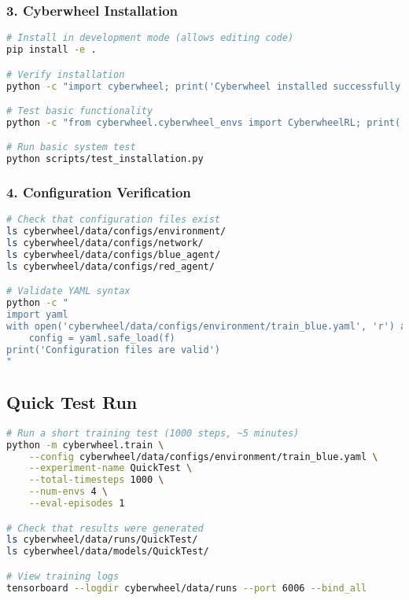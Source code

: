 \documentclass[12pt,a4paper]{article}
\begin{document}
\subsubsection{3. Cyberwheel Installation}
\begin{lstlisting}[language=bash, caption=Install Cyberwheel]
# Install in development mode (allows editing code)
pip install -e .

# Verify installation
python -c "import cyberwheel; print('Cyberwheel installed successfully')"

# Test basic functionality
python -c "from cyberwheel.cyberwheel_envs import CyberwheelRL; print('Environment imported successfully')"

# Run basic system test
python scripts/test_installation.py
\end{lstlisting}

\subsubsection{4. Configuration Verification}
\begin{lstlisting}[language=bash, caption=Verify Configuration Files]
# Check that configuration files exist
ls cyberwheel/data/configs/environment/
ls cyberwheel/data/configs/network/
ls cyberwheel/data/configs/blue_agent/
ls cyberwheel/data/configs/red_agent/

# Validate YAML syntax
python -c "
import yaml
with open('cyberwheel/data/configs/environment/train_blue.yaml', 'r') as f:
    config = yaml.safe_load(f)
print('Configuration files are valid')
"
\end{lstlisting}

\subsection{Quick Test Run}

\begin{lstlisting}[language=bash, caption=Quick Test Execution]
# Run a short training test (1000 steps, ~5 minutes)
python -m cyberwheel.train \
    --config cyberwheel/data/configs/environment/train_blue.yaml \
    --experiment-name QuickTest \
    --total-timesteps 1000 \
    --num-envs 4 \
    --eval-episodes 1

# Check that results were generated
ls cyberwheel/data/runs/QuickTest/
ls cyberwheel/data/models/QuickTest/

# View training logs
tensorboard --logdir cyberwheel/data/runs --port 6006 --bind_all
\end{lstlisting}
\end{document}
